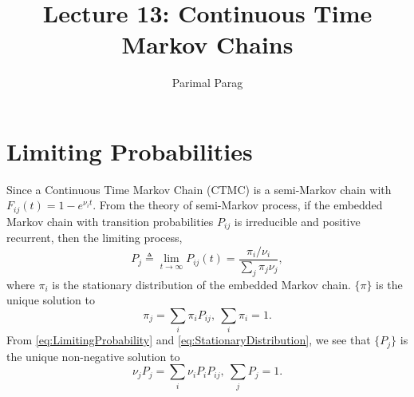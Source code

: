 \documentclass[a4paper,10pt]{article}
\date{}
\title{Lecture 13: Continuous Time Markov Chains}
\author{Parimal Parag}
\theoremstyle{plain}
\theoremstyle{definition}
\theoremstyle{remark}
\begin{document}
\maketitle
\section{Limiting Probabilities}
Since a Continuous Time Markov Chain (CTMC) is a semi-Markov chain with $F_{ij}(t)=1-e^{\nu_i t}$. From the theory of semi-Markov process, if the embedded Markov chain with transition probabilities $P_{ij}$ is irreducible and positive recurrent, then the limiting process,
\begin{equation}
\label{eq:LimitingProbability}
 P_{j} \triangleq \lim_{t \rightarrow \infty } P_{ij}(t)= \frac{\pi_i / \nu_i}{\sum_j \pi_j \nu_j},
\end{equation}
where $\pi_i$ is the stationary distribution of the embedded Markov chain. $\{\pi\}$ is the unique solution to
\begin{equation}
\label{eq:StationaryDistribution}
\pi_j = \sum_i \pi_i P_{ij},~ \sum_{i}\pi_i = 1. 
\end{equation}
From \ref{eq:LimitingProbability} and \ref{eq:StationaryDistribution}, we see that $\{P_j\}$ is the unique non-negative solution to 
\begin{equation}
\nu_jP_j=\sum_i \nu_iP_iP_{ij},~ \sum_j P_j =1.
\end{equation}
\end{document}

